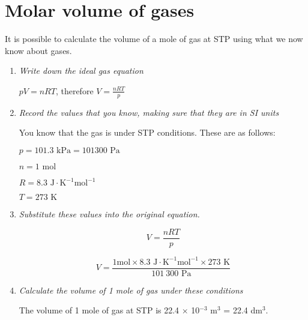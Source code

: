 



\section{Molar volume of gases}
\label{sec:gases:molar volume}

It is possible to calculate the volume of a mole of gas at STP using what we now know about gases.

\begin{enumerate}

\item{\textit{Write down the ideal gas equation}}
\begin{center}
$pV = nRT$, therefore $V = \frac{nRT}{p}$
\end{center}

\item{\textit{Record the values that you know, making sure that they are in SI units}}

You know that the gas is under STP conditions. These are as follows:

$p = 101.3 \text{ kPa} = 101300 \text{ Pa}$

$n = 1 \text{ mol}$

$R = 8.3 \text{ J} \cdot \text{K}^{-1} \text{mol}^{-1}$

$T = 273 \text{ K}$

\item{\textit{Substitute these values into the original equation.}}

\begin{equation*}
V = \frac{nRT}{p}
\end{equation*}

\begin{equation*}
V = \frac{1 \text{mol} \times 8.3 \text{ J} \cdot \text{K}^{-1} \text{mol}^{-1} \times 273 \text{ K}}{101~300 \text{ Pa}}
\end{equation*}

\item{\textit{Calculate the volume of 1 mole of gas under these conditions}

The volume of 1 mole of gas at STP is 22.4 $\times$ 10$^{-3}$ m$^{3}$ = 22.4 dm$^{3}$.}
\end{enumerate}






